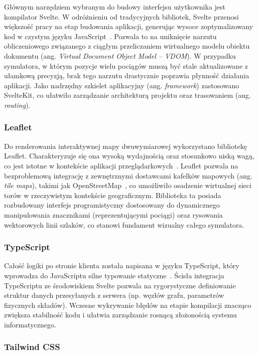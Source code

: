 \documentclass[twoside]{projektInzynierskiMS1z}
\begin{document}
Głównym narzędziem wybranym do budowy interfejsu użytkownika jest kompilator Svelte.
W odróżnieniu od tradycyjnych bibliotek, Svelte przenosi większość pracy na etap
budowania aplikacji, generując wysoce zoptymalizowany kod w czystym języku
JavaScript~\cite{svelte}. Pozwala to na uniknięcie narzutu obliczeniowego związanego
z ciągłym przeliczaniem wirtualnego modelu obiektu dokumentu (ang. \emph{Virtual
Document Object Model -- VDOM}). W przypadku symulatora, w którym pozycje wielu
pociągów muszą być stale aktualizowane z ułamkową precyzją, brak tego narzutu
drastycznie poprawia płynność działania aplikacji. Jako nadrzędny szkielet
aplikacyjny (ang. \emph{framework}) zastosowano SvelteKit, co ułatwiło zarządzanie
architekturą projektu oraz trasowaniem (ang. \emph{routing}).

\subsubsection{Leaflet}

Do renderowania interaktywnej mapy dwuwymiarowej wykorzystano bibliotekę Leaflet.
Charakteryzuje się ona wysoką wydajnością oraz stosunkowo niską wagą, co jest istotne
w kontekście aplikacji przeglądarkowych~\cite{leaflet}. Leaflet pozwala na
bezproblemową integrację z zewnętrznymi dostawcami kafelków mapowych (ang. \emph{tile
maps}), takimi jak OpenStreetMap~\cite{openstreetmap}, co umożliwiło osadzenie wirtualnej
sieci torów w rzeczywistym kontekście geograficznym. Biblioteka ta posiada rozbudowany
interfejs programistyczny dostosowany do dynamicznego manipulowania znacznikami
(reprezentującymi pociągi) oraz rysowania wektorowych linii szlaków, co stanowi
fundament wizualny całego symulatora.

\subsubsection{TypeScript}

Całość logiki po stronie klienta została napisana w języku TypeScript, który wprowadza
do JavaScriptu silne typowanie statyczne~\cite{typescript}. Ścisła integracja
TypeScriptu ze środowiskiem Svelte pozwala na rygorystyczne definiowanie struktur
danych przesyłanych z serwera (np. węzłów grafu, parametrów fizycznych składów).
Wczesne wykrywanie błędów na etapie kompilacji znacząco zwiększa stabilność kodu
i ułatwia zarządzanie rosnącą złożonością systemu informatycznego.

\subsubsection{Tailwind CSS}
\end{document}
